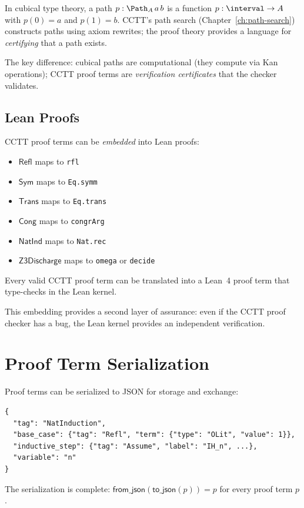 In cubical type theory, a path $p : \Path_A\, a\, b$ is a function
$p : \interval \to A$ with $p(0) = a$ and $p(1) = b$.  CCTT's path
search (Chapter~\ref{ch:path-search}) constructs paths using axiom
rewrites; the proof theory provides a language for \emph{certifying}
that a path exists.

The key difference: cubical paths are computational (they compute via
Kan operations); CCTT proof terms are \emph{verification certificates}
that the checker validates.

\subsection{Lean Proofs}

CCTT proof terms can be \emph{embedded} into Lean proofs:
\begin{itemize}
\item $\mathsf{Refl}$ maps to \texttt{rfl}
\item $\mathsf{Sym}$ maps to \texttt{Eq.symm}
\item $\mathsf{Trans}$ maps to \texttt{Eq.trans}
\item $\mathsf{Cong}$ maps to \texttt{congrArg}
\item $\mathsf{NatInd}$ maps to \texttt{Nat.rec}
\item $\mathsf{Z3Discharge}$ maps to \texttt{omega} or \texttt{decide}
\end{itemize}

\begin{theorem}
Every valid CCTT proof term can be translated into a Lean~4 proof term
that type-checks in the Lean kernel.
\end{theorem}

This embedding provides a second layer of assurance: even if the CCTT
proof checker has a bug, the Lean kernel provides an independent
verification.


\section{Proof Term Serialization}

Proof terms can be serialized to JSON for storage and exchange:
\begin{lstlisting}
{
  "tag": "NatInduction",
  "base_case": {"tag": "Refl", "term": {"type": "OLit", "value": 1}},
  "inductive_step": {"tag": "Assume", "label": "IH_n", ...},
  "variable": "n"
}
\end{lstlisting}
The serialization is complete: $\mathsf{from\_json}(\mathsf{to\_json}(p)) = p$
for every proof term $p$.

